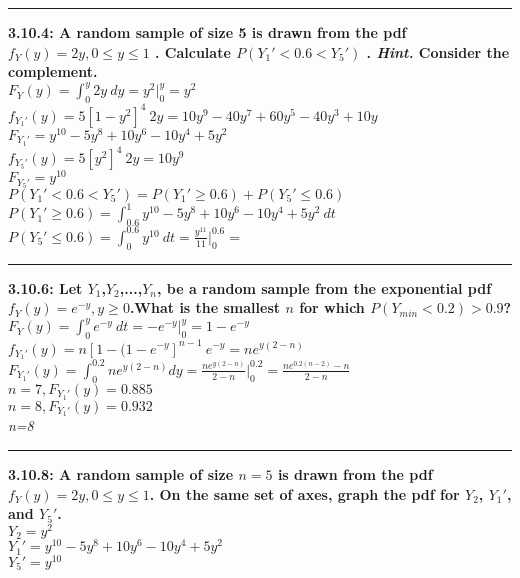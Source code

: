 \documentclass[11pt]{article}
\newcommand\question[2]{\vspace{.25in}\hrule\textbf{#1: #2}\vspace{.5em}\vspace{.10in}}
\begin{document}
\raggedright
\newcommand\NAME{Jonathan Lopez}  %
\newcommand\HWNUM{4}              %



\question{3.10.4}
{A random sample of size 5 is drawn from the pdf
    $f_{Y}(y)=2y, 0 \leq y \leq 1$
. Calculate
$P(Y_{1}' < 0.6 < Y_{5}')$
. \emph{Hint.} Consider the complement.}
\\
$
F_{Y}(y) 
=
\int_{0}^{y} 2y\ dy
=
y^{2} \big |_{0}^{y}
=
y^{2}
$
\\
$
f_{Y_{1}'}(y)
=
5[1-y^{2}]^{4} \ 2y
=
10y^{9} - 40y^{7} + 60y^{5} - 40y^{3} + 10y
$
\\
$
F_{Y_{1}'}
=
y^{10} - 5y^{8} + 10y^{6} - 10y^{4} + 5y^{2}
$
\\
$
f_{Y_{5}'}(y)
=
5[y^{2}]^{4} \ 2y
=
10y^9
$
\\
$
F_{Y_{5}'}
=
y^{10}
$
\\
$
P(Y_{1}' < 0.6 < Y_{5}')
=
P(Y_{1}' \geq 0.6) + P(Y_{5}' \leq 0.6)
$
\\
$
P(Y_{1}' \geq 0.6) 
=
\int_{0.6}^{1} y^{10} - 5y^{8} + 10y^{6} - 10y^{4} + 5y^{2} \ dt
$
\\
$
P(Y_{5}' \leq 0.6)
=
\int_{0}^{0.6} y^{10} \ dt
=
\frac{y^{11}}{11} \big |_{0}^{0.6}
=
$


\question{3.10.6}
{Let $Y_{1}$,$Y_{2}$,...,$Y_{n}$, be a random sample from the exponential pdf
$f_{Y}(y) = e^{-y},y \geq 0$.What is the smallest $n$ for which
$P(Y_{min} < 0.2) > 0.9$?
}
\\
$
F_{Y}(y) 
=
\int_{0}^{y} e^{-y} \ dt
=
-e^{-y} \big |_{0}^{y}
=
1 -e^{-y}
$
\\
$
f_{Y_{1}'}(y)
=
n[1-(1-e^{-y}]^{n-1} \ e^{-y}
=
ne^{y(2-n)}
$
\\
$
F_{Y_{1}'}(y)
=
\int_{0}^{0.2} ne^{y(2-n)} dy
=
\frac{ne^{y(2-n)}}{2-n} \big |_{0}^{0.2}
=
\frac{ne^{0.2(n-2)} - n}{2-n} 
$
\\
$
n=7,
F_{Y_{1}'}(y)
=
0.885
$
\\
$
n=8,
F_{Y_{1}'}(y)
=
0.932
$
\\
\emph{n=8}


\question{3.10.8}
{A random sample of size $n = 5$ is drawn from the pdf
$f_{Y}(y) = 2y, 0 \leq y \leq 1$.
On the same set of axes, graph the pdf for
$Y_{2}$, $Y_{1}'$, and $Y_{5}'$.}
\\
$
Y_{2} = y^{2}
$
\\
$
Y_{1}' = y^{10} - 5y^{8} + 10y^{6} - 10y^{4} + 5y^{2}
$
\\
$
Y_{5}' = y^{10}
$
\end{document}
